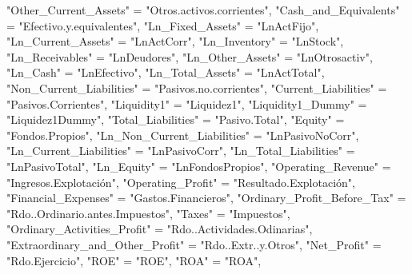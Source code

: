 \documentclass[
]{article}
\newenvironment{Shaded}{\begin{snugshade}}{\end{snugshade}}
\newcommand{\NormalTok}[1]{#1}
\newcommand{\OtherTok}[1]{\textcolor[rgb]{0.56,0.35,0.01}{#1}}
\newcommand{\StringTok}[1]{\textcolor[rgb]{0.31,0.60,0.02}{#1}}
\begin{document}
\begin{Shaded}
\begin{Highlighting}[]
    \StringTok{"Other\_Current\_Assets"} \OtherTok{=} \StringTok{"Otros.activos.corrientes"}\NormalTok{,}
    \StringTok{"Cash\_and\_Equivalents"} \OtherTok{=} \StringTok{"Efectivo.y.equivalentes"}\NormalTok{,}
    \StringTok{"Ln\_Fixed\_Assets"} \OtherTok{=} \StringTok{"LnActFijo"}\NormalTok{,}
    \StringTok{"Ln\_Current\_Assets"} \OtherTok{=} \StringTok{"LnActCorr"}\NormalTok{,}
    \StringTok{"Ln\_Inventory"} \OtherTok{=} \StringTok{"LnStock"}\NormalTok{,}
    \StringTok{"Ln\_Receivables"} \OtherTok{=} \StringTok{"LnDeudores"}\NormalTok{,}
    \StringTok{"Ln\_Other\_Assets"} \OtherTok{=} \StringTok{"LnOtrosactiv"}\NormalTok{,}
    \StringTok{"Ln\_Cash"} \OtherTok{=} \StringTok{"LnEfectivo"}\NormalTok{,}
    \StringTok{"Ln\_Total\_Assets"} \OtherTok{=} \StringTok{"LnActTotal"}\NormalTok{,}
    \StringTok{"Non\_Current\_Liabilities"} \OtherTok{=} \StringTok{"Pasivos.no.corrientes"}\NormalTok{,}
    \StringTok{"Current\_Liabilities"} \OtherTok{=} \StringTok{"Pasivos.Corrientes"}\NormalTok{,}
    \StringTok{"Liquidity1"} \OtherTok{=} \StringTok{"Liquidez1"}\NormalTok{,}
    \StringTok{"Liquidity1\_Dummy"} \OtherTok{=} \StringTok{"Liquidez1Dummy"}\NormalTok{,}
    \StringTok{"Total\_Liabilities"} \OtherTok{=} \StringTok{"Pasivo.Total"}\NormalTok{,}
    \StringTok{"Equity"} \OtherTok{=} \StringTok{"Fondos.Propios"}\NormalTok{,}
    \StringTok{"Ln\_Non\_Current\_Liabilities"} \OtherTok{=} \StringTok{"LnPasivoNoCorr"}\NormalTok{,}
    \StringTok{"Ln\_Current\_Liabilities"} \OtherTok{=} \StringTok{"LnPasivoCorr"}\NormalTok{,}
    \StringTok{"Ln\_Total\_Liabilities"} \OtherTok{=} \StringTok{"LnPasivoTotal"}\NormalTok{,}
    \StringTok{"Ln\_Equity"} \OtherTok{=} \StringTok{"LnFondosPropios"}\NormalTok{,}
    \StringTok{"Operating\_Revenue"} \OtherTok{=} \StringTok{"Ingresos.Explotación"}\NormalTok{,}
    \StringTok{"Operating\_Profit"} \OtherTok{=} \StringTok{"Resultado.Explotación"}\NormalTok{,}
    \StringTok{"Financial\_Expenses"} \OtherTok{=} \StringTok{"Gastos.Financieros"}\NormalTok{,}
    \StringTok{"Ordinary\_Profit\_Before\_Tax"} \OtherTok{=} \StringTok{"Rdo..Ordinario.antes.Impuestos"}\NormalTok{,}
    \StringTok{"Taxes"} \OtherTok{=} \StringTok{"Impuestos"}\NormalTok{,}
    \StringTok{"Ordinary\_Activities\_Profit"} \OtherTok{=} \StringTok{"Rdo..Actividades.Odinarias"}\NormalTok{,}
    \StringTok{"Extraordinary\_and\_Other\_Profit"} \OtherTok{=} \StringTok{"Rdo..Extr..y.Otros"}\NormalTok{,}
    \StringTok{"Net\_Profit"} \OtherTok{=} \StringTok{"Rdo.Ejercicio"}\NormalTok{,}
    \StringTok{"ROE"} \OtherTok{=} \StringTok{"ROE"}\NormalTok{,}
    \StringTok{"ROA"} \OtherTok{=} \StringTok{"ROA"}\NormalTok{,}

\end{Highlighting}
\end{Shaded}
\end{document}
